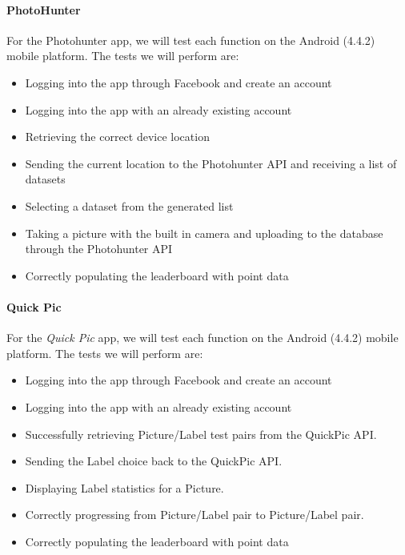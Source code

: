 \documentclass{article}
\begin{document}
\paragraph{PhotoHunter}
For the Photohunter app, we will test each function on the Android (4.4.2)
mobile platform.  The tests we will perform are:
\begin{itemize}

  \item Logging into the app through Facebook and create an account

  \item Logging into the app with an already existing account

  \item Retrieving the correct device location

  \item Sending the current location to the Photohunter API and receiving
        a list of datasets

  \item Selecting a dataset from the generated list

  \item Taking a picture with the built in camera and uploading to the
        database through the Photohunter API

  \item Correctly populating the leaderboard with point data

\end{itemize}

\paragraph{Quick Pic}
For the \textit{Quick Pic} app, we will test each function on the Android
(4.4.2) mobile platform.  The tests we will perform are:
\begin{itemize}

  \item Logging into the app through Facebook and create an account

  \item Logging into the app with an already existing account

  \item Successfully retrieving Picture/Label test pairs from the QuickPic API.

  \item Sending the Label choice back to the QuickPic API.

  \item Displaying Label statistics for a Picture.

  \item Correctly progressing from Picture/Label pair to Picture/Label pair.

  \item Correctly populating the leaderboard with point data

\end{itemize}
\end{document}
